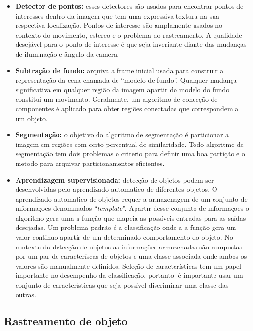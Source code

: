 	\begin{itemize}
		\item \textbf{Detector de pontos:} esses detectores são usados para encontrar pontos de interesses dentro da imagem que tem uma expressiva textura na sua respectiva localização. Pontos de interesse são amplamente usados no contexto do movimento, estereo e o problema do rastreamento. A qualidade desejável para o ponto de interesse é que seja inveriante diante das mudanças de iluminação e ângulo da camera.
	
		\item \textbf{Subtração de fundo:} arquiva a frame inicial usada para construir a representação da cena chamada de ``modelo de fundo''. Qualquer mudança significativa em qualquer região da imagem apartir do modelo do fundo constitui um movimento. Geralmente, um algoritmo de conecção de componentes é aplicado para obter regiões conectadas que correspondem a um objeto.

		\item \textbf{Segmentação:} o objetivo do algoritmo de segmentação é particionar a imagem em regiões com certo percentual de similaridade. Todo algoritmo de segmentação tem dois problemas o criterio para definir uma boa partição e o metodo para arquivar particionamentos eficientes.

		\item \textbf{Aprendizagem supervisionada:} detecção de objetos podem ser desenvolvidas pelo aprendizado automatico de diferentes objetos. O aprendizado automatico de objetos requer a armazenagem de um conjunto de informações denominados ``\textit{template}''. Apartir desse conjunto de informações o algoritmo gera uma a função que mapeia as possíveis entradas para as saídas desejadas. Um problema padrão é a classificação onde a a função gera um valor continuo apartir de um determinado comportamento do objeto. No contexto da detecção de objetos as informações armazenadas são compostas por um par de caracteríscas de objetos e uma classe associada onde ambos os valores são manualmente definidos. Seleção de características tem um papel importante no desempenho da classificação, portanto, é importante usar um conjunto de características que seja possível discriminar uma classe das outras.
	\end{itemize}

\subsection{Rastreamento de objeto}

